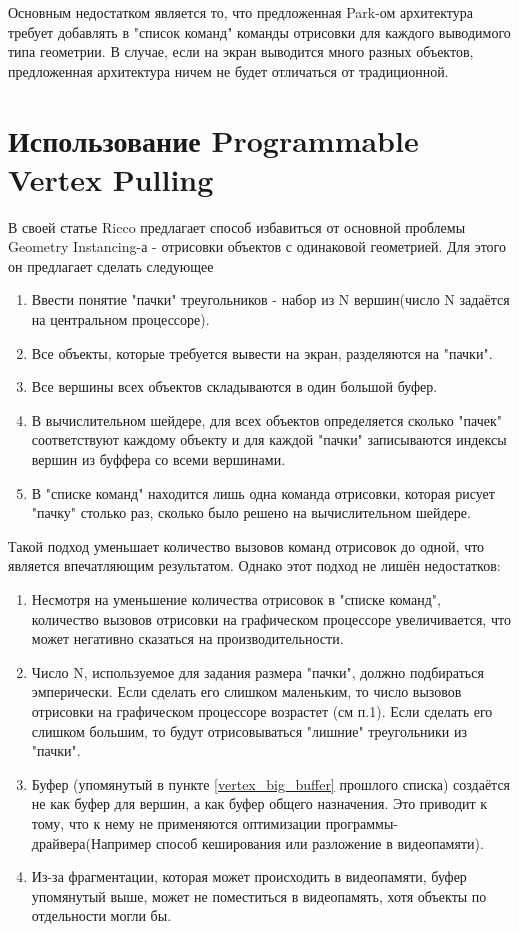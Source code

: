 	Основным недостатком является то, что предложенная Park-ом\cite{park2009fast} архитектура требует добавлять в "список команд" команды отрисовки для каждого выводимого типа геометрии. В случае, если на экран выводится много разных объектов, предложенная архитектура ничем не будет отличаться от традиционной.
	
\section{Использование Programmable Vertex Pulling}\label{ch2:Programmable-Vertex-Pulling} %
	В своей статье Ricco\cite{riccio2013introducing} предлагает способ избавиться от основной проблемы Geometry Instancing-а - отрисовки объектов с одинаковой геометрией. Для этого он предлагает сделать следующее
	\begin{enumerate}[1.]
		\item Ввести понятие "пачки" треугольников - набор из N вершин(число N задаётся на центральном процессоре).
		\item Все объекты, которые требуется вывести на экран, разделяются на "пачки".
		\item Все вершины всех объектов складываются в один большой буфер.\label{vertex_big_buffer}
		\item В вычислительном шейдере, для всех объектов определяется сколько "пачек" соответствуют каждому объекту и для каждой "пачки" записываются индексы вершин из буффера со всеми вершинами. 
		\item В "списке команд" находится лишь одна команда отрисовки, которая рисует "пачку" столько раз, сколько было решено на вычислительном шейдере.
	\end{enumerate}
	
	Такой подход уменьшает количество вызовов команд отрисовок до одной, что является впечатляющим результатом. Однако этот подход не лишён недостатков:
	\begin{enumerate}[1.]
		\item Несмотря на уменьшение количества отрисовок в "списке команд", количество вызовов отрисовки на графическом процессоре увеличивается, что может негативно сказаться на производительности. 
		\item Число N, используемое для задания размера "пачки", должно подбираться эмперически. Если сделать его слишком маленьким, то число вызовов отрисовки на графическом процессоре возрастет (см п.1). Если сделать его слишком большим, то будут отрисовываться "лишние" треугольники из "пачки".
		\item Буфер (упомянутый в пункте \ref{vertex_big_buffer} прошлого списка) создаётся не как буфер для вершин, а как буфер общего назначения. Это приводит к тому, что к нему не применяются оптимизации программы-драйвера(Например способ кеширования или разложение в видеопамяти).
		\item Из-за фрагментации, которая может происходить в видеопамяти, буфер упомянутый выше, может не поместиться в видеопамять, хотя объекты по отдельности могли бы.
	\end{enumerate}
		
